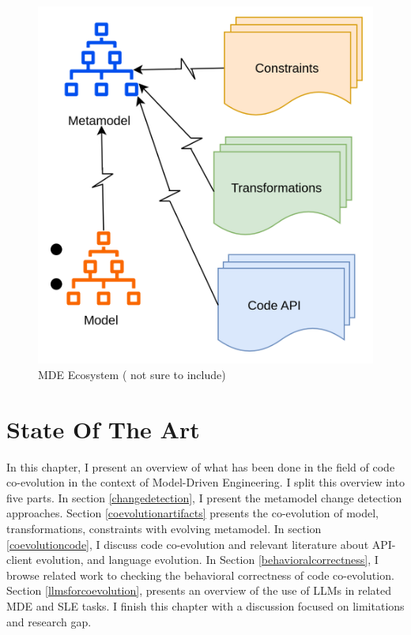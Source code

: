 \begin{figure}[htbp]
	\begin{center}
		\includegraphics[width=0.6\linewidth]{./pics/soaPics/mdeecosystem.png}
	\end{center}
	\caption{MDE Ecosystem ( not sure to include)}
	\label{fig:mde_ecosystem}
\end{figure}


\chapter{State Of The Art}

In this chapter, I present an overview of what has been done in the field of code co-evolution in the context of Model-Driven Engineering. I split this overview into five  parts. In section \ref{changedetection}, I present the metamodel change detection approaches. Section \ref{coevolutionartifacts} presents the co-evolution of model, transformations, constraints with evolving metamodel. In section \ref{coevolutioncode}, I discuss code co-evolution and relevant literature about API-client evolution, and language evolution. In Section \ref{behavioralcorrectness}, I browse related work to checking the behavioral correctness of code co-evolution. Section \ref{llmsforcoevolution}, presents an overview of the use of LLMs in related MDE and SLE tasks. I finish this chapter with a discussion focused on limitations and research gap.
